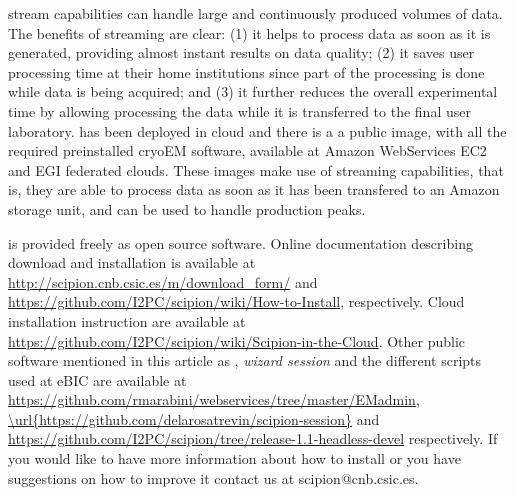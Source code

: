  \scipion stream capabilities can handle large and continuously produced volumes of data. The benefits of streaming are clear: (1) it helps to process data as soon as it is generated,  providing almost instant results on data quality; (2) it saves user processing time at their home institutions since part of the processing is done while data is being acquired; and (3) 
 it further reduces the overall experimental time by allowing processing the data while it is transferred to the final user laboratory. \scipion has been deployed in cloud and there is a  a public image, with all the required preinstalled cryoEM software,  available at Amazon WebServices EC2 and EGI federated clouds. These images make use of \scipion streaming capabilities, that is, they are able to process data as soon as it has been transfered to an Amazon storage unit, and can be used to handle  production peaks.
 
 
\scipion is provided 
freely as open source software. Online documentation
describing \scipion download and installation is available
at \url{http://scipion.cnb.csic.es/m/download_form/} and \url{https://github.com/I2PC/scipion/wiki/How-to-Install}, respectively. Cloud installation instruction are available at \url{https://github.com/I2PC/scipion/wiki/Scipion-in-the-Cloud}. Other public software mentioned in this article as \emadmin, \emph{wizard session} and the different scripts used at eBIC are available at \url{https://github.com/rmarabini/webservices/tree/master/EMadmin}, \url{\url{https://github.com/delarosatrevin/scipion-session}} and \url{https://github.com/I2PC/scipion/tree/release-1.1-headless-devel} respectively.
If you would like to have more information about how to install \scipion or you have suggestions on how to improve it contact us at scipion@cnb.csic.es.






